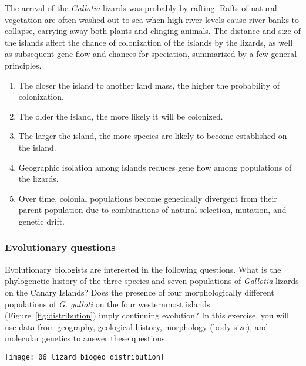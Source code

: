 \documentclass[12pt, hidelinks]{exam}
\begin{document}
The arrival of the \emph{Gallotia} lizards was probably by rafting. Rafts of natural vegetation are often
washed out to sea when high river levels cause river banks to collapse,
carrying away both plants and clinging animals. The distance and size of the islands affect the chance of colonization of the islands by the lizards, as well as subsequent gene flow and chances for speciation, summarized by a few general principles.

\begin{enumerate}

	\item The closer the island to another land mass, the higher the
probability of colonization.

	\item The older the island, the more likely it will be colonized.
	
	\item The larger the island, the more species are likely to become
established on the island.

	\item Geographic isolation among islands reduces gene flow among populations of the lizards.
	
	\item Over time, colonial populations become genetically divergent from
their parent population due to combinations of natural selection, mutation, and
genetic drift.

\end{enumerate} 

\subsubsection*{Evolutionary questions}

Evolutionary biologists are interested
in the following questions. What is the phylogenetic history of the three
species and seven populations of \emph{Gallotia} lizards on the Canary
Islands? Does the presence of four morphologically different populations
of \emph{G. galloti} on the four westernmost islands
(Figure~\ref{fig:distribution}) imply continuing evolution? In this
exercise, you will use data from geography, geological history,
morphology (body size), and molecular genetics to answer
these questions.

\begin{center}

	\texttt{[image: 06\_lizard\_biogeo\_distribution]}
	

\end{center}
\end{document}
